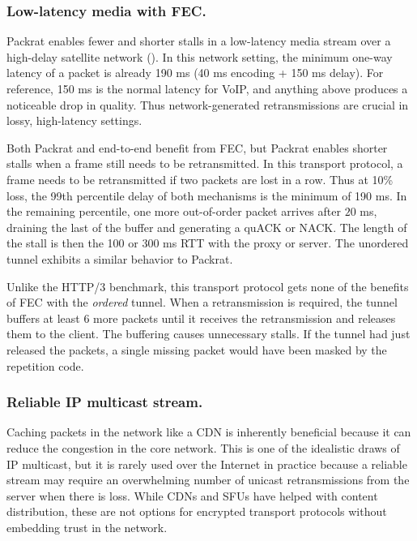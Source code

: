 \subsubsection{Low-latency media with FEC.}

Packrat enables fewer and shorter stalls in a low-latency media stream over a
high-delay satellite network (). In this network setting,
the minimum one-way latency of a packet is already 190 ms (40 ms encoding + 150
ms delay). For reference, 150 ms is the normal latency for VoIP, and anything
above produces a noticeable drop in quality. Thus network-generated
retransmissions are crucial in lossy, high-latency settings.

Both Packrat and end-to-end benefit from FEC, but Packrat enables shorter stalls when
a frame still needs to be retransmitted. In this transport protocol, a frame
needs to be retransmitted if two packets are lost in a row. Thus at 10\% loss,
the 99th percentile delay of both mechanisms is the minimum of 190 ms. In the
remaining percentile, one more out-of-order packet arrives after $20$ ms,
draining the last of the buffer and generating a quACK or NACK. The length of
the stall is then the 100 or 300 ms RTT with the proxy or server. The unordered
tunnel exhibits a similar behavior to Packrat.

Unlike the HTTP/3 benchmark, this transport protocol gets none of the benefits
of FEC with the \textit{ordered} tunnel. When a retransmission is required, the
tunnel buffers at least 6 more packets until it receives the retransmission and
releases them to the client. The buffering causes unnecessary stalls. If the
tunnel had just released the packets, a single missing packet would have been
masked by the repetition code.

\subsubsection{Reliable IP multicast stream.}

Caching packets in the network like a CDN is inherently beneficial because it
can reduce the congestion in the core network. This is one of the idealistic
draws of IP multicast, but it is rarely used over the Internet in practice
because a reliable stream may require an overwhelming number of unicast
retransmissions from the server when there is loss. While CDNs and SFUs have
helped with content distribution, these are not options for encrypted transport
protocols without embedding trust in the network.

